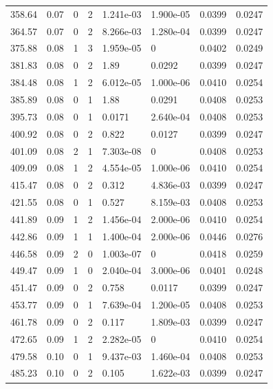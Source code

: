 \documentclass[preview]{standalone}
\begin{document}
{{{\begin{tabular}{L{1.2cm}C{1.2cm} C{0.3cm}C{0.5cm} C{1.4cm}C{1.4cm} C{1.4cm}C{1.4cm}}
  358.64  &  0.07  & 0     &  2 &  1.241e-03  & 1.900e-05  & 0.0399 &  0.0247   \\ 
  364.57  &  0.07  & 0     &  2 &  8.266e-03  & 1.280e-04  & 0.0399 &  0.0247   \\ 
  375.88  &  0.08  & 1     &  3 &  1.959e-05  & 0  & 0.0402 &  0.0249   \\ 
  381.83  &  0.08  & 0     &  2 &  1.89  & 0.0292  & 0.0399 &  0.0247   \\ 
  384.48  &  0.08  & 1     &  2 &  6.012e-05  & 1.000e-06  & 0.0410 &  0.0254   \\ 
  385.89  &  0.08  & 0     &  1 &  1.88  & 0.0291  & 0.0408 &  0.0253   \\ 
  395.73  &  0.08  & 0     &  1 &  0.0171  & 2.640e-04  & 0.0408 &  0.0253   \\ 
  400.92  &  0.08  & 0     &  2 &  0.822  & 0.0127  & 0.0399 &  0.0247   \\ 
  401.09  &  0.08  & 2     &  1 &  7.303e-08  & 0  & 0.0408 &  0.0253   \\ 
  409.09  &  0.08  & 1     &  2 &  4.554e-05  & 1.000e-06  & 0.0410 &  0.0254   \\ 
  415.47  &  0.08  & 0     &  2 &  0.312  & 4.836e-03  & 0.0399 &  0.0247   \\ 
  421.55  &  0.08  & 0     &  1 &  0.527  & 8.159e-03  & 0.0408 &  0.0253   \\ 
  441.89  &  0.09  & 1     &  2 &  1.456e-04  & 2.000e-06  & 0.0410 &  0.0254   \\ 
  442.86  &  0.09  & 1     &  1 &  1.400e-04  & 2.000e-06  & 0.0446 &  0.0276   \\ 
  446.58  &  0.09  & 2     &  0 &  1.003e-07  & 0  & 0.0418 &  0.0259   \\ 
  449.47  &  0.09  & 1     &  0 &  2.040e-04  & 3.000e-06  & 0.0401 &  0.0248   \\ 
  451.47  &  0.09  & 0     &  2 &  0.758  & 0.0117  & 0.0399 &  0.0247   \\ 
  453.77  &  0.09  & 0     &  1 &  7.639e-04  & 1.200e-05  & 0.0408 &  0.0253   \\ 
  461.78  &  0.09  & 0     &  2 &  0.117  & 1.809e-03  & 0.0399 &  0.0247   \\ 
  472.65  &  0.09  & 1     &  2 &  2.282e-05  & 0  & 0.0410 &  0.0254   \\ 
  479.58  &  0.10  & 0     &  1 &  9.437e-03  & 1.460e-04  & 0.0408 &  0.0253   \\ 
  485.23  &  0.10  & 0     &  2 &  0.105  & 1.622e-03  & 0.0399 &  0.0247   \\ 

\end{tabular}}}}
\end{document}
